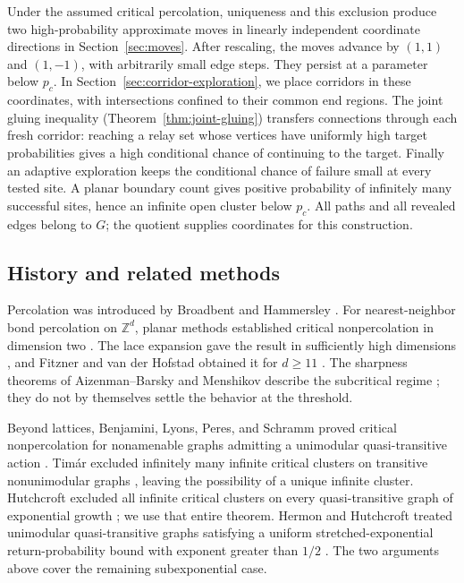 \documentclass[11pt]{article}
\theoremstyle{definition}
\begin{document}
Under the assumed critical percolation, uniqueness and this exclusion
produce two high-probability approximate moves in linearly independent
coordinate directions in Section~\ref{sec:moves}. After rescaling, the moves advance by
$(1,1)$ and $(1,-1)$, with arbitrarily small edge steps.
They persist at a parameter below $p_c$. In
Section~\ref{sec:corridor-exploration}, we place corridors in
these coordinates, with intersections confined to their common
end regions. The joint gluing inequality
(Theorem~\ref{thm:joint-gluing}) transfers connections through each
fresh corridor: reaching a relay set whose vertices have uniformly
high target probabilities gives a high conditional chance of continuing
to the target. Finally an adaptive exploration keeps the
conditional chance of failure small at every tested site. A planar
boundary count gives positive probability of infinitely many
successful sites, hence an infinite open cluster below $p_c$.
All paths and all revealed edges belong to $G$; the quotient supplies
coordinates for this construction.


\subsection{History and related methods}

Percolation was introduced by Broadbent and Hammersley
\cite{BroadbentHammersley1957}. For nearest-neighbor bond percolation
on $\mathbb Z^d$, planar methods established critical nonpercolation in
dimension two \cite{Harris1960,Kesten1980}. The lace expansion gave
the result in sufficiently high dimensions \cite{HaraSlade1990},
and Fitzner and van der Hofstad obtained it for $d\ge11$
\cite{FitznerHofstad2017}. The sharpness theorems of Aizenman--Barsky
and Menshikov describe the subcritical regime
\cite{AizenmanBarsky1987,Menshikov1986}; they do not by themselves
settle the behavior at the threshold.

Beyond lattices, Benjamini, Lyons, Peres, and Schramm proved critical
nonpercolation for nonamenable graphs admitting a unimodular
quasi-transitive action \cite{BLPS1999Critical}. Tim\'ar excluded
infinitely many infinite critical clusters on transitive
nonunimodular graphs \cite{Timar2006Nonunimodular}, leaving the
possibility of a unique infinite cluster. Hutchcroft excluded all
infinite critical clusters on every quasi-transitive graph of
exponential growth \cite[Theorem~1.2]{Hutchcroft2016}; we use that
entire theorem. Hermon and Hutchcroft treated unimodular
quasi-transitive graphs satisfying a uniform stretched-exponential
return-probability bound with exponent greater than $1/2$
\cite[Theorem~1.2]{HermonHutchcroft2021}. The two arguments above
cover the remaining subexponential case.
\end{document}
